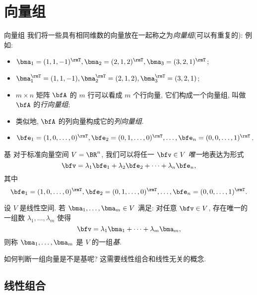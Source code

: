 \section{向量组}


\begin{frame}{向量组}
	\onslide<+->
	我们将一些具有相同维数的向量放在一起称之为\emph{向量组}(可以有重复的):
	\onslide<+->
	例如:
	\begin{itemize}
		\item $\bma_1=(1,1,-1)^\rmT, \bma_2=(2,1,2)^\rmT, \bma_3=(3,2,1)^\rmT$;
		\item $\bma_1^\rmT=(1,1,-1), \bma_2^\rmT=(2,1,2), \bma_3^\rmT=(3,2,1)$;
		\item $m\times n$ 矩阵 $\bfA$ 的 $m$ 行可以看成 $m$ 个行向量, 它们构成一个向量组, 叫做 $\bfA$ 的\emph{行向量组};
		\item 类似地, $\bfA$ 的列向量构成它的\emph{列向量组}.
		\item $\bfe_1=(1,0,\dots,0)^\rmT,\bfe_2=(0,1,\dots,0)^\rmT,\dots,\bfe_n=(0,0,\dots,1)^\rmT$.
	\end{itemize}
\end{frame}


\begin{frame}{基\noexer}
	\onslide<+->
	对于标准向量空间 $V=\BR^n$, 我们可以将任一 $\bfv\in V$ \emph{唯一}地表达为形式
	\[\bfv=\lambda_1\bfe_1+\lambda_2\bfe_2+\cdots+\lambda_n\bfe_n,\]
	其中
	\[\bfe_1=(1,0,\dots,0)^\rmT,\bfe_2=(0,1,\dots,0)^\rmT,\dots,\bfe_n=(0,0,\dots,1)^\rmT.\]
	\begin{definition}
		设 $V$ 是线性空间.
		若 $\bma_1,\dots,\bma_m\in V$ 满足: 对任意 $\bfv\in V$, 存在唯一的一组数 $\lambda_1,\dots,\lambda_m$ 使得
		\[\bfv=\lambda_1\bma_1+\cdots+\lambda_m \bma_m,\]
		则称 $\bma_1,\dots,\bma_m$ 是 $V$ 的一组\emph{基}.
	\end{definition}
	\onslide<+->
	如何判断一组向量是不是基呢?
	\onslide<+->
	这需要线性组合和线性无关的概念.
\end{frame}


\subsection{线性组合}


